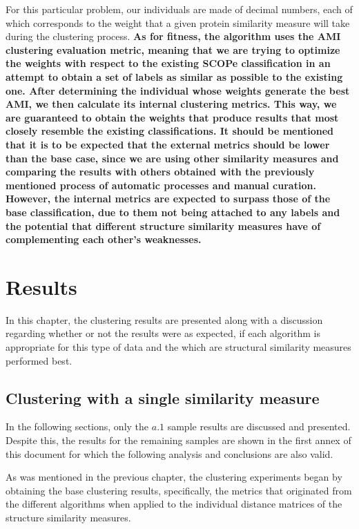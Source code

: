 For this particular problem, our individuals are made of decimal numbers, each of which corresponds to the weight that a given protein similarity measure will take during the clustering process. \textbf{As for fitness, the algorithm uses the AMI clustering evaluation metric, meaning that we are trying to optimize the weights with respect to the existing SCOPe classification in an attempt to obtain a set of labels as similar as possible to the existing one. After determining the individual whose weights generate the best AMI, we then calculate its internal clustering metrics. This way, we are guaranteed to obtain the weights that produce results that most closely resemble the existing classifications. It should be mentioned that it is to be expected that the external metrics should be lower than the base case, since we are using other similarity measures and comparing the results with others obtained with the previously mentioned process of automatic processes and manual curation. However, the internal metrics are expected to surpass those of the base classification, due to them not being attached to any labels and the potential that different structure similarity measures have of complementing each other's weaknesses.}

\chapter{Results}

In this chapter, the clustering results are presented along with a discussion regarding whether or not the results were as expected, if each algorithm is appropriate for this type of data and the which are structural similarity measures performed best.

\section{Clustering with a single similarity measure}

In the following sections, only the $a.1$ sample results are discussed and presented. Despite this, the results for the remaining samples are shown in the first annex of this document for which the following analysis and conclusions are also valid.  

As was mentioned in the previous chapter, the clustering experiments began by obtaining the base clustering results, specifically, the metrics that originated from the different algorithms when applied to the individual distance matrices of the structure similarity measures.

